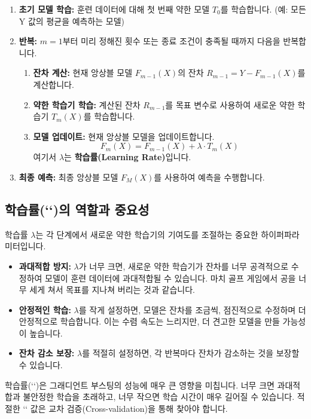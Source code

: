 \documentclass[11pt,a4paper]{article}
\begin{document}
\begin{enumerate}
    \item \textbf{초기 모델 학습:} 훈련 데이터에 대해 첫 번째 약한 모델 $T_0$를 학습합니다. (예: 모든 Y 값의 평균을 예측하는 모델)
    \item \textbf{반복:} $m=1$부터 미리 정해진 횟수 또는 종료 조건이 충족될 때까지 다음을 반복합니다.
    \begin{enumerate}
        \item \textbf{잔차 계산:} 현재 앙상블 모델 $F_{m-1}(X)$의 잔차 $R_{m-1} = Y - F_{m-1}(X)$를 계산합니다.
        \item \textbf{약한 학습기 학습:} 계산된 잔차 $R_{m-1}$를 목표 변수로 사용하여 새로운 약한 학습기 $T_m(X)$를 학습합니다.
        \item \textbf{모델 업데이트:} 현재 앙상블 모델을 업데이트합니다.
        \[ F_m(X) = F_{m-1}(X) + \lambda \cdot T_m(X) \]
        여기서 $\lambda$는 \textbf{학습률(Learning Rate)}입니다.
    \end{enumerate}
    \item \textbf{최종 예측:} 최종 앙상블 모델 $F_M(X)$를 사용하여 예측을 수행합니다.
\end{enumerate}

\subsection{학습률(`\lambda`)의 역할과 중요성}
학습률 $\lambda$는 각 단계에서 새로운 약한 학습기의 기여도를 조절하는 중요한 하이퍼파라미터입니다.

\begin{itemize}
    \item \textbf{과대적합 방지:} $\lambda$가 너무 크면, 새로운 약한 학습기가 잔차를 너무 공격적으로 수정하여 모델이 훈련 데이터에 과대적합될 수 있습니다. 마치 골프 게임에서 공을 너무 세게 쳐서 목표를 지나쳐 버리는 것과 같습니다.
    \item \textbf{안정적인 학습:} $\lambda$를 작게 설정하면, 모델은 잔차를 조금씩, 점진적으로 수정하며 더 안정적으로 학습합니다. 이는 수렴 속도는 느리지만, 더 견고한 모델을 만들 가능성이 높습니다.
    \item \textbf{잔차 감소 보장:} $\lambda$를 적절히 설정하면, 각 반복마다 잔차가 감소하는 것을 보장할 수 있습니다.
\end{itemize}

\begin{warningbox}
학습률(`\lambda`)은 그래디언트 부스팅의 성능에 매우 큰 영향을 미칩니다. 너무 크면 과대적합과 불안정한 학습을 초래하고, 너무 작으면 학습 시간이 매우 길어질 수 있습니다. 적절한 `\lambda` 값은 교차 검증(Cross-validation)을 통해 찾아야 합니다.
\end{warningbox}
\end{document}
